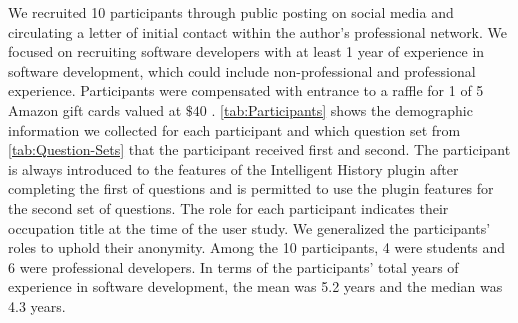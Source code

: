 We recruited 10 participants through public posting on social media and circulating a letter of initial contact within the author's professional network.
We focused on recruiting software developers with at least 1 year of experience in software development, 
which could include non-professional and professional experience.
Participants were compensated with entrance to a raffle for 1 of 5 Amazon gift cards valued at $\$40$ .
\autoref{tab:Participants} shows the demographic information we collected for each participant and which question set from \autoref{tab:Question-Sets} that the participant received first and second.
The participant is always introduced to the features of the Intelligent History plugin after completing the first of questions and 
is permitted to use the plugin features for the second set of questions.
The role for each participant indicates their occupation title at the time of the user study.
We generalized the participants' roles to uphold their anonymity.
Among the 10 participants, 4 were students and 6 were professional developers.
In terms of the participants' total years of experience in software development, 
the mean was 5.2 years and the median was 4.3 years.

